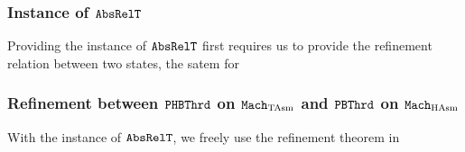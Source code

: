 \subsubsection{Instance of ${\mathrm{\texttt{AbsRelT}}}$}

Providing the instance of ${\mathrm{\texttt{AbsRelT}}}$ first requires us 
to provide 
the refinement relation between two states, the satem for 

\subsubsection{Refinement between ${\mathrm{\texttt{PHBThrd}}}$ on ${\mathrm{\texttt{Mach}}}_{\mathrm{TAsm}}$ and 
 ${\mathrm{\texttt{PBThrd}}}$ on ${\mathrm{\texttt{Mach}}}_{\mathrm{HAsm}}$}

With the instance of ${\mathrm{\texttt{AbsRelT}}}$,
we freely use the refinement theorem in 

